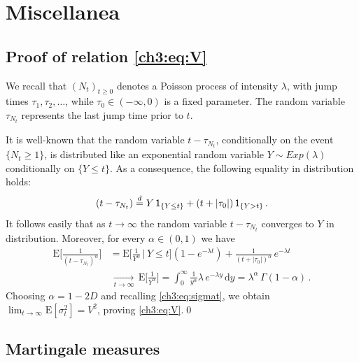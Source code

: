 \documentclass[a4paper,reqno,11pt]{amsart}
\numberwithin{equation}{section}
\newcommand{\dd}{\text{\rm d}}             %
\newcommand{\PEfont}{\mathrm}
\newcommand{\E}{\ensuremath{\PEfont E}}
\newcommand{\ind}{{\sf 1}}
\def\dd{\mathrm{d}}
\begin{document}
\bigskip

\appendix

\section{Miscellanea}
\label{ch3:sec:app}


\subsection{Proof of relation \eqref{ch3:eq:V}}
\label{sec:avvol}

We recall that $(N_t)_{t\ge 0}$ denotes a Poisson process of intensity $\lambda$,
with jump times $\tau_1, \tau_2, \ldots$, while $\tau_0 \in (-\infty,0)$ is a fixed
parameter. The random variable $\tau_{N_t}$
represents the last jump time prior to $t$.

It is well-known that the random variable $t - \tau_{N_t}$,
conditionally on the event $\{N_t \ge 1\}$, is distributed like an exponential random
variable $Y \sim Exp(\lambda)$ conditionally on $\{Y \le t\}$. As a consequence,
the following equality in distribution holds:
\begin{equation*}
	(t-\tau_{N_t}) \overset{d}{=} Y \, \ind_{\{Y \le t\}} + (t + |\tau_0|) \, \ind_{\{Y > t\}} \,.
\end{equation*}
It follows easily that as $t \to \infty$ the random variable $t - \tau_{N_t}$
converges to $Y$ in distribution.
Moreover, for every $\alpha \in (0, 1)$ we have
\begin{equation*}
\begin{split}
	\E\bigg[ \frac{1}{(t-\tau_{N_t})^{\alpha}} \bigg] & = 
	\E\bigg[ \frac{1}{Y^\alpha} \,\bigg|\, Y \le t \bigg] 
	(1-e^{-\lambda t}) + \frac{1}{(t + |\tau_0|)^{\alpha}} \, e^{-\lambda t} \\
	& \,\xrightarrow[t\to\infty]{}\, \E\bigg[ \frac{1}{Y^\alpha} \bigg]
	= \int_0^\infty \frac{1}{y^\alpha} \lambda \, e^{-\lambda y} \, \dd y
	= \lambda^\alpha \, \Gamma(1-\alpha) \,.
\end{split}
\end{equation*}
Choosing $\alpha = 1-2D$ and recalling \eqref{ch3:eq:sigmat}, we obtain
$\lim_{t\to\infty} \E[\sigma_t^2] = V^2$, proving \eqref{ch3:eq:V}.\qed

\subsection{Martingale measures}
\label{ch3:sec:martingale}
\end{document}
